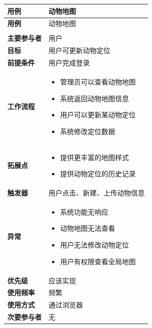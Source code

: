 \documentclass[12pt,a4paper,UTF8]{article}
\begin{document}
\begin{xltabular}{\linewidth}{|>{\raggedright\arraybackslash}p{3cm}|>{\raggedright\arraybackslash}p{8cm}|}
  \hline
  \textbf{用例} & 动物地图 \\ \hline \endfirsthead
  \hline
  \textbf{用例} & 动物地图 \\ \hline \endhead
  \hline
   \\ \endfoot
  \hline \endlastfoot

  \textbf{主要参与者} & 用户 \\ \hline
  \textbf{目标} & 用户可更新动物定位 \\ \hline
  \textbf{前提条件} & 用户完成登录 \\ \hline
  \textbf{工作流程} & 
  \vspace{-0.5em}
  \begin{itemize}[topsep=0pt, partopsep=0pt, left=0pt, nosep]
      \item 管理员可以查看动物地图
      \item 系统返回动物地图信息
      \item 用户可以更新某动物定位
      \item 系统修改定位数据
  \end{itemize} \\ \hline
  \textbf{拓展点} &
  \vspace{-0.5em}
  \begin{itemize}[topsep=0pt, partopsep=0pt, left=0pt, nosep]
      \item 提供更丰富的地图样式
      \item 提供动物定位的历史记录
  \end{itemize} \\ \hline
  \textbf{触发器} & 用户点击、新建、上传动物信息 \\ \hline
  \textbf{异常} & 
  \vspace{-0.5em}
  \begin{itemize}[topsep=0pt, partopsep=0pt, left=0pt, nosep]
      \item 系统功能无响应
      \item 动物地图无法查看
      \item 用户无法修改动物定位
      \item 用户有权限查看全局地图
  \end{itemize} \\ \hline
  \textbf{优先级} & 应该实现 \\ \hline
  \textbf{使用频率} & 频繁 \\ \hline
  \textbf{使用方式} & 通过浏览器 \\ \hline
  \textbf{次要参与者} & 无 \\ \hline
\end{xltabular}
\end{document}
